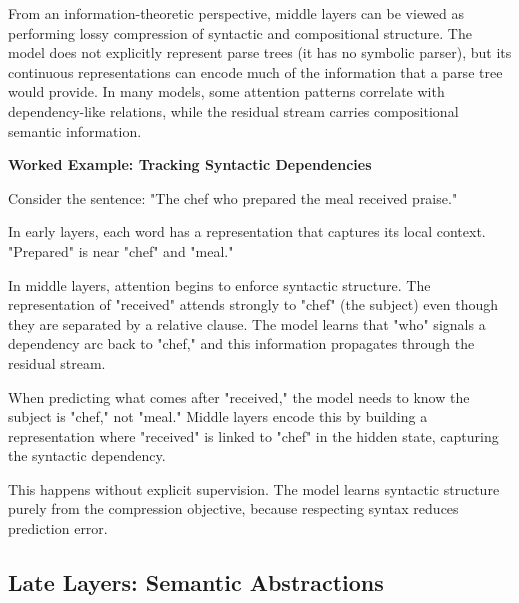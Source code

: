 \vspace{1em}

From an information-theoretic perspective, middle layers can be viewed as performing lossy compression of syntactic and compositional structure. The model does not explicitly represent parse trees (it has no symbolic parser), but its continuous representations can encode much of the information that a parse tree would provide. In many models, some attention patterns correlate with dependency-like relations, while the residual stream carries compositional semantic information.

\vspace{1.5em}

\begin{examplebox}
\textbf{Worked Example: Tracking Syntactic Dependencies}

Consider the sentence: "The chef who prepared the meal received praise."

\vspace{0.5em}

In early layers, each word has a representation that captures its local context. "Prepared" is near "chef" and "meal."

\vspace{0.5em}

In middle layers, attention begins to enforce syntactic structure. The representation of "received" attends strongly to "chef" (the subject) even though they are separated by a relative clause. The model learns that "who" signals a dependency arc back to "chef," and this information propagates through the residual stream.

\vspace{0.5em}

When predicting what comes after "received," the model needs to know the subject is "chef," not "meal." Middle layers encode this by building a representation where "received" is linked to "chef" in the hidden state, capturing the syntactic dependency.

\vspace{0.5em}

This happens without explicit supervision. The model learns syntactic structure purely from the compression objective, because respecting syntax reduces prediction error.
\end{examplebox}

\vspace{1.5em}

\subsection{Late Layers: Semantic Abstractions}


